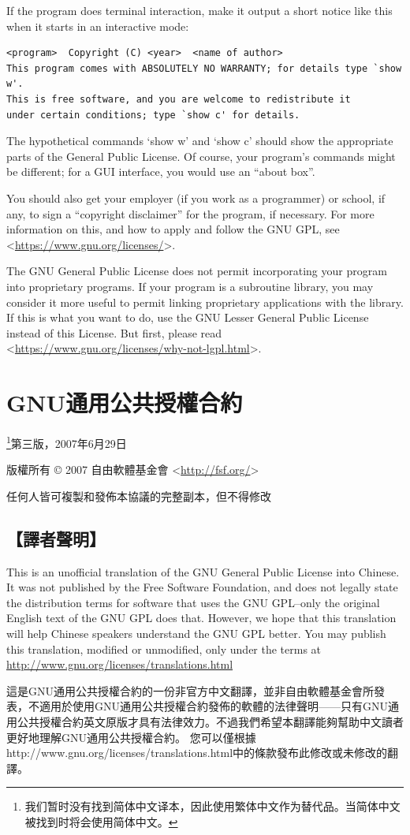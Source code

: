 If the program does terminal interaction, make it output a short notice like this when it starts in an interactive mode:
\begin{verbatim}
<program>  Copyright (C) <year>  <name of author>
This program comes with ABSOLUTELY NO WARRANTY; for details type `show w'.
This is free software, and you are welcome to redistribute it
under certain conditions; type `show c' for details.
\end{verbatim}\par
The hypothetical commands `show w' and `show c' should show the appropriate parts of the General Public License. Of course, your program's commands might be different; for a GUI interface, you would use an “about box”.\par
You should also get your employer (if you work as a programmer) or school, if any, to sign a “copyright disclaimer” for the program, if necessary. For more information on this, and how to apply and follow the GNU GPL, see <\url{https://www.gnu.org/licenses/}>.\par
The GNU General Public License does not permit incorporating your program into proprietary programs. If your program is a subroutine library, you may consider it more useful to permit linking proprietary applications with the library. If this is what you want to do, use the GNU Lesser General Public License instead of this License. But first, please read <\url{https://www.gnu.org/licenses/why-not-lgpl.html}>.
\section{GNU通用公共授權合約}
\footnote{我们暂时没有找到简体中文译本，因此使用繁体中文作为替代品。当简体中文被找到时将会使用简体中文。}\cite{gplzht}第三版，2007年6月29日\par
版權所有 © 2007 自由軟體基金會 <\url{http://fsf.org/}>\par
任何人皆可複製和發佈本協議的完整副本，但不得修改\par
\subsection{【譯者聲明】}
This is an unofficial translation of the GNU General Public License into Chinese. It was not published by the Free Software Foundation, and does not legally state the distribution terms for software that uses the GNU GPL--only the original English text of the GNU GPL does that. However, we hope that this translation will help Chinese speakers understand the GNU GPL better. You may publish this translation, modified or unmodified, only under the terms at \url{http://www.gnu.org/licenses/translations.html}\par
這是GNU通用公共授權合約的一份非官方中文翻譯，並非自由軟體基金會所發表，不適用於使用GNU通用公共授權合約發佈的軟體的法律聲明——只有GNU通用公共授權合約英文原版才具有法律效力。不過我們希望本翻譯能夠幫助中文讀者更好地理解GNU通用公共授權合約。 您可以僅根據http://www.gnu.org/licenses/translations.html中的條款發布此修改或未修改的翻譯。

